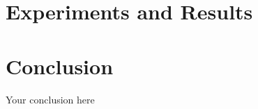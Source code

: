 \documentclass{article}
\begin{document}
\section{Experiments and Results}

\section{Conclusion}
Your conclusion here



\end{document}
